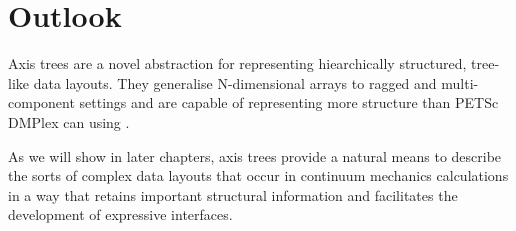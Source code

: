 \documentclass[thesis]{subfiles}
\begin{document}

\section{Outlook}

Axis trees are a novel abstraction for representing hiearchically structured, tree-like data layouts.
They generalise \numpy{} N-dimensional arrays to ragged and multi-component settings and are capable of representing more structure than PETSc DMPlex can using .

As we will show in later chapters, axis trees provide a natural means to describe the sorts of complex data layouts that occur in continuum mechanics calculations in a way that retains important structural information and facilitates the development of expressive interfaces.
\end{document}
